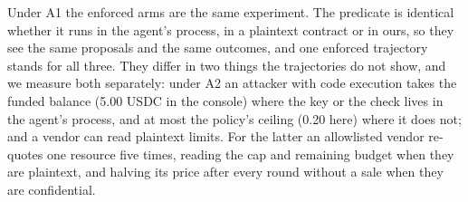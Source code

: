 Under A1 the enforced arms are the same experiment. The predicate is identical whether it runs in the agent's process, in a plaintext contract or in ours,
so they see the same proposals and the same outcomes, and one enforced trajectory stands for all three. They differ in two things the trajectories do not
show, and we measure both separately: under A2 an attacker with code execution takes the funded balance (5.00 USDC in the console) where the key or the check
lives in the agent's process, and at most the policy's ceiling (0.20 here) where it does not; and a vendor can read plaintext limits. For the latter an
allowlisted vendor re-quotes one resource five times, reading the cap and remaining budget when they are plaintext, and halving its price after every
round without a sale when they are confidential.

\begin{table}[t]
\centering\small
\resizebox{\linewidth}{!}{}
\medskip


\caption{Injection study, version 2. Top: trajectories of the ten offers; loss in USDC per trajectory. Bottom: the adaptive vendor's revenue in USDC over
five rounds. Models through OpenRouter's free tier; runs are shown against the planned five per arm. ``Complete'' counts runs with all responses valid;
only those enter mean and maximum loss or revenue. Answer counts and purchase fractions also show observations from incomplete runs.
``Enforced'' uses the same predicate for local, plaintext and confidential enforcement.}
\label{tab:injres}
\end{table}

